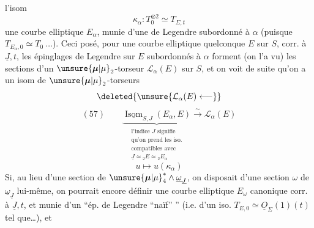  l'isom
\[
\kappa_\alpha:T_0^{\otimes2}\simeq T_{\Sigma,t}
\]
 une courbe elliptique $E_\alpha$,  munie
d'une  de Legendre subordonné
à $\alpha$ (puisque $T_{E_\alpha,0}\simeq T_0\ \ldots$). Ceci
posé, pour une courbe elliptique quelconque
$E$ sur $S$, corr. à $\underline J,t$, les épinglages
de Legendre sur $E$ subordonnés à $\alpha$
forment (on l'a vu) les sections d'un
$\unsure{\boldsymbol{\mu}|\mu}_2$-torseur $\mathcal L_\alpha(E)$ sur $S$, et on voit
de suite qu'on a un isom de
$\unsure{\boldsymbol{\mu}|\mu}_2$-torseurs
\[
\deleted{\unsure{\mathcal L_\alpha(E)\longleftarrow}}
\]
\[
(57)\qquad
\underbrace{\underline{\operatorname{Isom}}_{S,J}(E_\alpha,E)}_{
\substack{\text{l'indice }J\text{ signifie}\\
\text{qu'on prend les iso.}\\
\text{compatibles avec}\\
\underline J\simeq{}_2E\simeq{}_2E_\alpha}}
\xrightarrow{\sim}\mathcal L_\alpha(E)
\]
\[
u\longmapsto u(\kappa_\alpha)
\]
Si, au lieu d'une section\inserted{$\alpha$} de $\unsure{\boldsymbol{\mu}|\mu}_4^*\wedge\underline\omega_{\underline J}$, on
disposait d'une section $\omega$ de $\underline\omega_{\underline J}$ lui-même,
on pourrait encore définir une courbe
elliptique $E_\omega$ canonique corr. à $\underline J,t$, et
munie d'un ``ép. de Legendre ``naïf'' ''
(i.e. d'un iso. $T_{E,0}\simeq\underline O_\Sigma(1)(t)$ tel que\ldots), et


